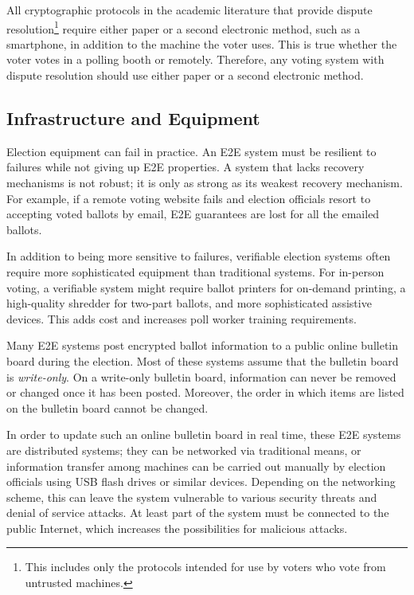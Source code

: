 All cryptographic protocols in the academic literature that provide
dispute resolution\footnote{This includes only the protocols intended
  for use by voters who vote from untrusted machines.}  require either
paper or a second electronic method, such as a smartphone, in addition
to the machine the voter uses. This is true whether the voter votes in
a polling booth or remotely. Therefore, any voting system with dispute
resolution should use either paper or a second electronic method.

\subsection{Infrastructure and Equipment}

Election equipment can fail in practice. An E2E system must be
resilient to failures while not giving up E2E properties. A system
that lacks recovery mechanisms is not robust; it is only as strong as
its weakest recovery mechanism. For example, if a remote voting
website fails and election officials resort to accepting voted ballots
by email, E2E guarantees are lost for all the emailed ballots.

In addition to being more sensitive to failures, verifiable election
systems often require more sophisticated equipment than traditional
systems. For in-person voting, a verifiable system might require
ballot printers for on-demand printing, a high-quality shredder for
two-part ballots, and more sophisticated assistive devices. This adds
cost and increases poll worker training requirements.

Many E2E systems post encrypted ballot information to a public online
bulletin board during the election. Most of these systems assume that
the bulletin board is \emph{write-only}. On a write-only bulletin
board, information can never be removed or changed once it has been
posted. Moreover, the order in which items are listed on the bulletin
board cannot be changed.

In order to update such an online bulletin board in real time, these E2E
systems are distributed systems; they can be networked via traditional
means, or information transfer among machines can be carried out
manually by election officials using USB flash drives or similar
devices. Depending on the networking scheme, this can leave the system
vulnerable to various security threats and denial of service
attacks. At least part of the system must be connected to the public
Internet, which increases the possibilities for malicious attacks.

